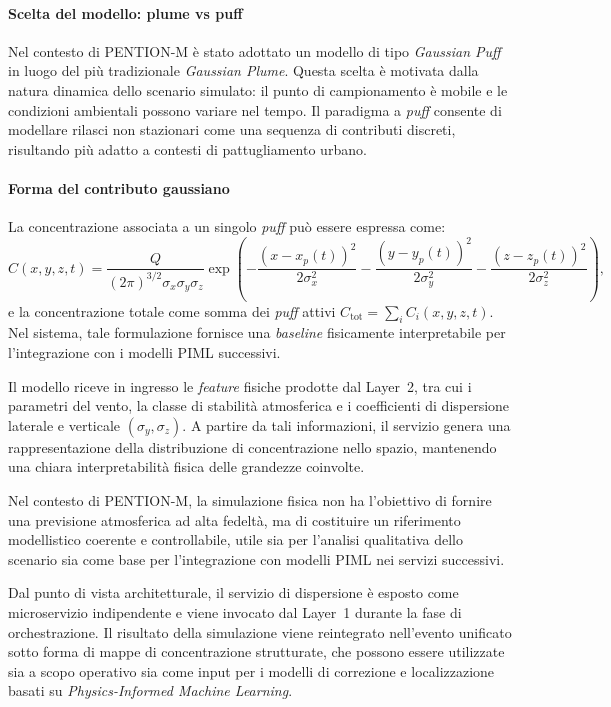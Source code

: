 \paragraph{Scelta del modello: plume vs puff}

Nel contesto di \textsc{PENTION-M} è stato adottato un modello di tipo \emph{Gaussian Puff} in luogo del più tradizionale \emph{Gaussian Plume}.
Questa scelta è motivata dalla natura dinamica dello scenario simulato: il punto di campionamento è mobile e le condizioni ambientali possono variare nel tempo.
Il paradigma a \textit{puff} consente di modellare rilasci non stazionari come una sequenza di contributi discreti, risultando più adatto a contesti di pattugliamento urbano.

\paragraph{Forma del contributo gaussiano}

La concentrazione associata a un singolo \textit{puff} può essere espressa come:
\[
	C(x,y,z,t)=\frac{Q}{(2\pi)^{3/2}\sigma_x\sigma_y\sigma_z}
	\exp\!\left(
	-\frac{(x-x_p(t))^2}{2\sigma_x^2}
	-\frac{(y-y_p(t))^2}{2\sigma_y^2}
	-\frac{(z-z_p(t))^2}{2\sigma_z^2}
	\right),
\]
e la concentrazione totale come somma dei \textit{puff} attivi
$C_{\text{tot}}=\sum_i C_i(x,y,z,t)$.
Nel sistema, tale formulazione fornisce una \textit{baseline} fisicamente interpretabile per l’integrazione con i modelli PIML successivi.

Il modello riceve in ingresso le \textit{feature} fisiche prodotte dal Layer~2, tra cui i parametri del vento, la classe di stabilità atmosferica e i coefficienti di dispersione laterale e verticale $(\sigma_y, \sigma_z)$.
A partire da tali informazioni, il servizio genera una rappresentazione della distribuzione di concentrazione nello spazio, mantenendo una chiara interpretabilità fisica delle grandezze coinvolte.

Nel contesto di \textsc{PENTION-M}, la simulazione fisica non ha l’obiettivo di fornire una previsione atmosferica ad alta fedeltà, ma di costituire un riferimento modellistico coerente e controllabile, utile sia per l’analisi qualitativa dello scenario sia come base per l’integrazione con modelli PIML nei servizi successivi.

Dal punto di vista architetturale, il servizio di dispersione è esposto come microservizio indipendente e viene invocato dal Layer~1 durante la fase di orchestrazione.
Il risultato della simulazione viene reintegrato nell’evento unificato sotto forma di mappe di concentrazione strutturate, che possono essere utilizzate sia a scopo operativo sia come input per i modelli di correzione e localizzazione basati su \emph{Physics-Informed Machine Learning}.

